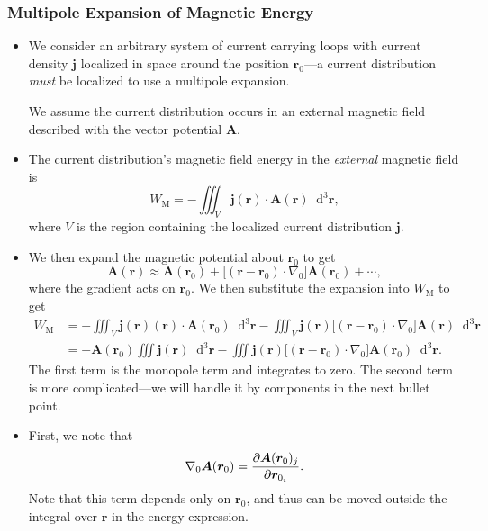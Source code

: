 \documentclass[11pt, a4paper]{article}
\newcommand{\diff}{\mathop{}\!\mathrm{d}} %
\newcommand{\dr}{\diff^{3} \r}  %
\renewcommand{\vec}[1]{\bm{#1}} %
\renewcommand{\r}{\vec{r}}
\newcommand{\A}{\vec{A}} %
\renewcommand{\j}{\vec{j}}  %
\renewcommand{\grad}{\nabla}
\begin{document}
\subsubsection{Multipole Expansion of Magnetic Energy}
\begin{itemize}
	\item We consider an arbitrary system of current carrying loops with current density $ \j $ localized in space around the position $ \r_{0} $---a current distribution \textit{must} be localized to use a multipole expansion. 
	
	We assume the current distribution occurs in an external magnetic field described with the vector potential $ \A $. 
	
	\item The current distribution's magnetic field energy in the \textit{external} magnetic field is
	\begin{equation*}
		W_{\text{M}} = - \iiint_{V} \j(\r) \cdot \A(\r) \dr,
	\end{equation*}
	where $ V $ is the region containing the localized current distribution $ \j $. 
	
	\item We then expand the magnetic potential about $ \r_{0} $ to get
	\begin{equation*}
		\A(\r) \approx \A(\r_{0}) + \big[(\r - \r_{0}) \cdot \grad_{0}\big] \A(\r_{0}) + \cdots,
	\end{equation*}
	where the gradient acts on $ \r_{0} $. We then substitute the expansion into $ W_{\text{M}} $ to get
	\begin{align*}
		W_{\text{M}} &= - \iiint_{V}\j(\r) (\r)\cdot \A(\r_{0}) \dr - \iiint_{V} \j(\r) \big[(\r - \r_{0}) \cdot \grad_{0}\big] \A(\r) \dr\\
		& = - \A(\r_{0})\iiint \j(\r)\dr - \iiint \j(\r)\big[(\r - \r_{0})\cdot \grad_{0}\big] \A(\r_{0})\dr.
	\end{align*}
	The first term is the monopole term and integrates to zero. The second term is more complicated---we will handle it by components in the next bullet point.

    \item First, we note that
	\begin{equation*}
		\grad_{0} \A(\r_{0}) = \pdv{\A(\r_{0})_{j}}{\r_{0_{i}}}.
	\end{equation*}
	Note that this term depends only on $ \r_{0} $, and thus can be moved outside the integral over $ \r $ in the energy expression.
	

\end{itemize}
\end{document}

